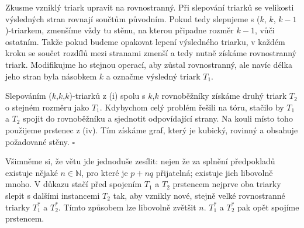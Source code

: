 Zkusme vzniklý triark upravit na rovnostranný. Při slepování triarků se velikosti výsledných stran rovnají součtům původním. Pokud tedy slepujeme s ($k$, $k$, $k-1$)-triarkem, zmenšíme vždy tu stěnu, na kterou připadne rozměr $k-1$, vůči ostatním. Takže pokud budeme opakovat lepení výsledného triarku, v každém kroku se součet rozdílů mezi stranami zmenší a tedy nutně získáme rovnostranný triark. Modifikujme ho stejnou operací, aby zůstal rovnostranný, ale navíc délka jeho stran byla násobkem $k$ a označme výsledný triark $T_1$.

Slepováním ($k$,$k$,$k$)-triarků z (i) spolu s $k$,$k$ rovnoběžníky získáme druhý triark $T_2$ o stejném rozměru jako $T_1$. Kdybychom celý problém řešili na tóru, stačilo by $T_1$ a $T_2$ spojit do rovnoběžníku a sjednotit odpovídající strany. Na kouli místo toho použijeme prstenec z (iv). Tím získáme graf, který je kubický, rovinný a obsahuje požadované stěny. $\square$

Všimněme si, že větu jde jednoduše zesílit: nejen že za splnění předpokladů existuje nějaké $n \in \mathbb{N}$, pro které je $p+nq$ přijatelná; existuje jich libovolně mnoho. V důkazu stačí před spojením $T_1$ a $T_2$ prstencem nejprve oba triarky slepit s dalšími instancemi $T_2$ tak, aby vznikly nové, stejně velké rovnostranné triarky $T_{1}^*$ a $T_{2}^*$. Tímto způsobem lze libovolně zvětšit $n$. $T_{1}^*$ a $T_{2}^*$ pak opět spojíme prstencem.